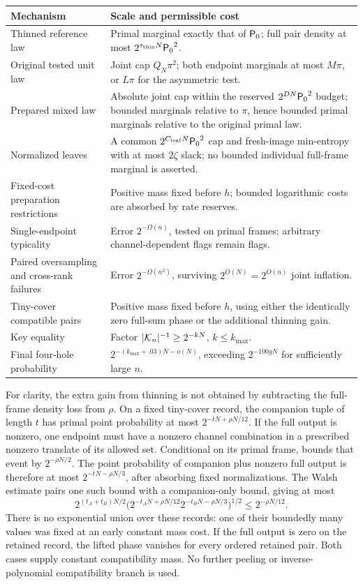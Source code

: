\begin{center}
\begin{tabular}{@{}p{}p{}@{}}
\toprule
Mechanism & Scale and permissible cost\\
\midrule
Thinned reference law & Primal marginal exactly that of
\({\mathsf P_0}\); full pair density at most
\(2^{\tau_{\mathrm{thin}}N}{\mathsf P_0}^2\).\\
Original tested unit law & Joint cap \(Q_N\pi^2\); both endpoint
marginals at most \(M\pi\), or \(L\pi\) for the asymmetric test.\\
Prepared mixed law & Absolute joint cap within the reserved
\(2^{DN}{\mathsf P_0}^2\) budget; bounded marginals relative to
\(\pi\), hence bounded primal marginals relative to the original
primal law.\\
Normalized leaves & A common \(2^{C_{\mathrm{leaf}}N}{\mathsf P_0}^2\)
cap and fresh-image min-entropy with at most \(2\zeta\) slack;
no bounded individual full-frame marginal is asserted.\\
Fixed-cost preparation restrictions & Positive mass fixed before
\(h\); bounded logarithmic costs are absorbed by rate reserves.\\
Single-endpoint typicality & Error \(2^{-\Omega(n)}\), tested on
primal frames; arbitrary channel-dependent flags remain flags.\\
Paired oversampling and cross-rank failures & Error
\(2^{-\Omega(n^2)}\), surviving \(2^{O(N)}=2^{O(n)}\)
joint inflation.\\
Tiny-cover compatible pairs & Positive mass fixed before \(h\),
using either the identically zero full-sum phase or the additional
thinning gain.\\
Key equality & Factor \(|\mathcal K_n|^{-1}\ge2^{-kN}\),
\(k\le k_{\max}\).\\
Final four-hole probability &
\(2^{-(k_{\max}+.03)N-o(N)}\), exceeding
\(2^{-100gN}\) for sufficiently large \(n\).\\
\bottomrule
\end{tabular}
\end{center}

For clarity, the extra gain from thinning is not obtained by
subtracting the full-frame density loss from \(\rho\).
On a fixed tiny-cover record, the companion tuple of length
\(t\) has primal point probability at most
\(2^{-tN+\rho N/12}\).  If the full output is nonzero, one
endpoint must have a nonzero channel combination in a prescribed
nonzero translate of its allowed set.  Conditional on its primal
frame,  bounds that event by
\(2^{-\rho N/2}\).  The point probability of companion plus
nonzero full output is therefore at most
\(2^{-tN-\rho N/3}\), after absorbing fixed normalizations.
The Walsh estimate pairs one such bound with a companion-only
bound, giving at most
\[
 2^{(t_A+t_B)N/2}
 \bigl(2^{-t_AN+\rho N/12}
       2^{-t_BN-\rho N/3}\bigr)^{1/2}
 \le2^{-\rho N/12}.
\]
There is no exponential union over these records: one of their
boundedly many values was fixed at an early constant mass cost.
If the full output is zero on the retained record, the lifted
phase vanishes for every ordered retained pair.  Both cases
supply constant compatibility mass.  No further peeling or
inverse-polynomial compatibility branch is used.

